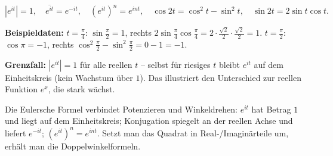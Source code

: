 \begin{ergebnis}
\begin{equation*}
  |e^{it}|=1,\quad \overline{e^{it}}=e^{-it},\quad (e^{it})^n=e^{int},\quad
  \cos2t=\cos^2t-\sin^2t,\quad \sin2t=2\sin t\cos t .
\end{equation*}
\end{ergebnis}

\begin{kontrolle}
\textbf{Beispieldaten:} $t=\frac\pi4$: $\sin\frac\pi2=1$, rechts
$2\sin\frac\pi4\cos\frac\pi4=2\cdot\frac{\sqrt2}{2}\cdot\frac{\sqrt2}{2}=1$.
\checkmark $t=\frac\pi2$: $\cos\pi=-1$, rechts
$\cos^2\frac\pi2-\sin^2\frac\pi2=0-1=-1$. \checkmark

\textbf{Grenzfall:} $|e^{it}|=1$ für alle reellen $t$ -- selbst für
riesiges $t$ bleibt $e^{it}$ auf dem Einheitskreis (kein Wachstum über
$1$). Das illustriert den Unterschied zur reellen Funktion $e^x$, die
stark wächst. \checkmark
\end{kontrolle}

\begin{merksatz}
Die Eulersche Formel verbindet Potenzieren und Winkeldrehen: $e^{it}$ hat
Betrag $1$ und liegt auf dem Einheitskreis; Konjugation spiegelt an der
reellen Achse und liefert $e^{-it}$; $(e^{it})^n=e^{int}$. Setzt man das
Quadrat in Real-/Imaginärteile um, erhält man die Doppelwinkelformeln.
\end{merksatz}
